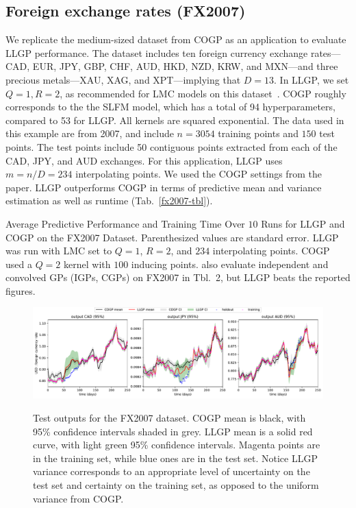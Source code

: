 \documentclass[twoside]{article}
\begin{document}
\subsection{Foreign exchange rates (FX2007)}\label{fx2007-results}

We replicate the medium-sized dataset from COGP as an application to evaluate LLGP performance. The dataset includes ten foreign currency exchange rates---CAD, EUR, JPY, GBP, CHF, AUD, HKD, NZD, KRW, and MXN---and three precious metals---XAU, XAG, and XPT---implying that $D=13$. In LLGP, we set $Q=1,R=2$, as recommended for LMC models on this dataset~\citep{alvarez2010efficient}. COGP roughly corresponds to the the SLFM model, which has a total of 94 hyperparameters, compared to 53 for LLGP. All kernels are squared exponential. The data used in this example are from 2007, and include $n=3054$ training points and $150$ test points. The test points include 50 contiguous points extracted from each of the CAD, JPY, and AUD exchanges. For this application, LLGP uses $m=n/D=234$ interpolating points. We used the COGP settings from the paper. LLGP outperforms COGP in terms of predictive mean and variance estimation as well as runtime (Tab.~\ref{fx2007-tbl}).

\begin{table}[!ht]
  \caption{Average Predictive Performance and Training Time Over $10$ Runs for LLGP and COGP on the FX2007 Dataset. Parenthesized values are standard error. LLGP was run with LMC set to $Q=1$, $R=2$, and $234$ interpolating points. COGP used a $Q=2$ kernel with $100$ inducing points. \cite{nguyen2014collaborative} also evaluate independent and convolved GPs (IGPs, CGPs) on FX2007 in Tbl.~2, but LLGP beats the reported figures.}
\label{fx2007-tbl}
\begin{center}
  \begin{small}
    \begin{sc}
      
\end{sc}
\end{small}
\end{center}
\end{table}

\begin{figure}[!ht]
\centering
{\includegraphics[width=\textwidth]{fx2007graph.pdf}}

\caption{Test outputs for the FX2007 dataset. COGP mean is black, with 95\% confidence intervals shaded in grey. LLGP mean is a solid red curve, with light green 95\% confidence intervals. Magenta points are in the training set, while blue ones are in the test set. Notice LLGP variance corresponds to an appropriate level of uncertainty on the test set and certainty on the training set, as opposed to the uniform variance from COGP.}
\label{fx2007-graph}
\end{figure}
\end{document}
